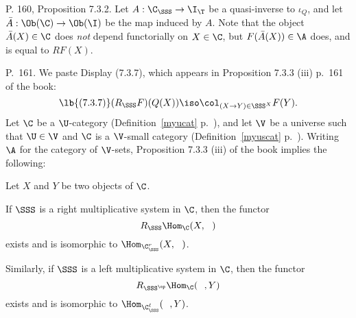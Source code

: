 \documentclass[12pt]{article}
\theoremstyle{remark}
\theoremstyle{definition}
\begin{document}
%

\begin{s}
P. 160, Proposition 7.3.2. Let $A:\C_\SSS\to\I_\T$ be a quasi-inverse to $\iota_Q$, and let $\bar A:\Ob(\C)\to\Ob(\I)$ be the map induced by $A$. Note that the object $\bar A(X)\in\C$ does \emph{not} depend functorially on $X\in\C$, but $F(\bar A(X))\in\A$ does, and is equal to $RF(X)$.
\end{s}

%

\begin{s}
P.~161. We paste Display (7.3.7), which appears in Proposition 7.3.3 (iii) p.~161 of the book: 
\begin{equation}\lb{(7.3.7)}
(R_\SSS F)(Q(X))\iso\col_{(X\to Y)\in\SSS^X}F(Y).
\end{equation} 
Let $\C$ be a $\U$-category (Definition~\ref{myucat} p.~), and let $\V$ be a universe such that $\U\in\V$ and $\C$ is a $\V$-small category (Definition~\ref{myuscat} p.~). Writing $\A$ for the category of $\V$-sets, Proposition 7.3.3 (iii) of the book implies the following:

Let $X$ and $Y$ be two objects of $\C$. 

If $\SSS$ is a right multiplicative system in $\C$, then the functor 
$$
R_\SSS\Hom_\C(X,\ \ )
$$ 
exists and is isomorphic to $\Hom_{\C_\SSS^r}(X,\ \ )$. 

Similarly, if $\SSS$ is a left multiplicative system in $\C$, then the functor 
$$
R_{\SSS^{\op}}\Hom_\C(\ \ ,Y)
$$ 
exists and is isomorphic to $\Hom_{\C_\SSS^\ell}(\ \ ,Y)$. 
\end{s}

\end{document}
